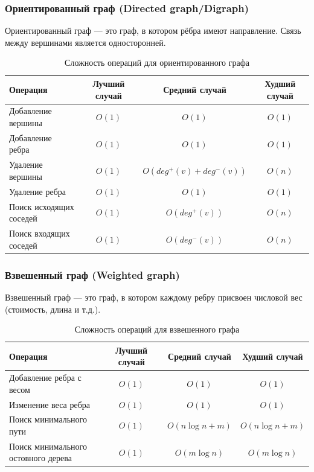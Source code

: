 \documentclass[a4paper,12pt]{article}
\begin{document}
\subsubsection{Ориентированный граф (Directed graph/Digraph)}
\label{subsubsec:ориентированный-граф-directed-graphdigraph}

Ориентированный граф --- это граф, в котором рёбра имеют направление. Связь между вершинами является односторонней.

\begin{table}[H]
    \centering
    \begin{tabular}{|l|c|c|c|}
        \hline
        Операция & Лучший случай & Средний случай & Худший случай \\
        \hline
        Добавление вершины & $O(1)$ & $O(1)$ & $O(1)$ \\
        \hline
        Добавление ребра & $O(1)$ & $O(1)$ & $O(1)$ \\
        \hline
        Удаление вершины & $O(1)$ & $O(deg^+(v) + deg^-(v))$ & $O(n)$ \\
        \hline
        Удаление ребра & $O(1)$ & $O(1)$ & $O(1)$ \\
        \hline
        \makecell[l]{Поиск исходящих \\соседей} & $O(1)$ & $O(deg^+(v))$ & $O(n)$ \\
        \hline
        \makecell[l]{Поиск входящих \\соседей} & $O(1)$ & $O(deg^-(v))$ & $O(n)$ \\
        \hline
    \end{tabular}
    \caption{Сложность операций для ориентированного графа}
\end{table}

\subsubsection{Взвешенный граф (Weighted graph)}
\label{subsubsec:взвешенный-граф-weighted-graph}

Взвешенный граф --- это граф, в котором каждому ребру присвоен числовой вес (стоимость, длина и т.д.).

\begin{table}[H]
    \centering
    \begin{tabular}{|l|c|c|c|}
        \hline
        Операция & Лучший случай & Средний случай & Худший случай \\
        \hline
        Добавление ребра с весом & $O(1)$ & $O(1)$ & $O(1)$ \\
        \hline
        Изменение веса ребра & $O(1)$ & $O(1)$ & $O(1)$ \\
        \hline
        Поиск минимального пути & $O(1)$ & $O(n \log n + m)$ & $O(n \log n + m)$ \\
        \hline
        \makecell[l]{Поиск минимального \\остовного дерева} & $O(1)$ & $O(m \log n)$ & $O(m \log n)$ \\
        \hline
    \end{tabular}
    \caption{Сложность операций для взвешенного графа}
\end{table}
\end{document}
